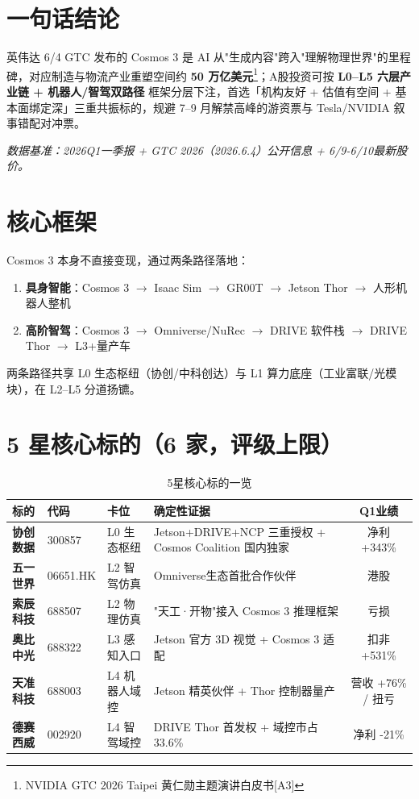 \section{一句话结论}

英伟达 6/4 GTC 发布的 Cosmos 3 是 AI 从"生成内容"跨入"理解物理世界"的里程碑，对应制造与物流产业重塑空间约 \textbf{50 万亿美元}\footnote{NVIDIA GTC 2026 Taipei 黄仁勋主题演讲白皮书[A3]}；A股投资可按 \textbf{L0--L5 六层产业链 + 机器人/智驾双路径} 框架分层下注，首选「机构友好 + 估值有空间 + 基本面绑定深」三重共振标的，规避 7--9 月解禁高峰的游资票与 Tesla/NVIDIA 叙事错配对冲票。

\textit{数据基准：2026Q1一季报 + GTC 2026（2026.6.4）公开信息 + 6/9-6/10最新股价。}

\section{核心框架}

Cosmos 3 本身不直接变现，通过两条路径落地：
\begin{enumerate}[leftmargin=2em]
  \item \textbf{具身智能}：Cosmos 3 $\rightarrow$ Isaac Sim $\rightarrow$ GR00T $\rightarrow$ Jetson Thor $\rightarrow$ 人形机器人整机
  \item \textbf{高阶智驾}：Cosmos 3 $\rightarrow$ Omniverse/NuRec $\rightarrow$ DRIVE 软件栈 $\rightarrow$ DRIVE Thor $\rightarrow$ L3+量产车
\end{enumerate}

两条路径共享 L0 生态枢纽（协创/中科创达）与 L1 算力底座（工业富联/光模块），在 L2--L5 分道扬镳。

\section{5 星核心标的（6 家，评级上限）}

\begin{table}[H]
\centering
\small
\renewcommand{\arraystretch}{1.3}
\begin{tabularx}{\textwidth}{l l l X c}
\toprule
\textbf{标的} & \textbf{代码} & \textbf{卡位} & \textbf{确定性证据} & \textbf{Q1业绩} \\
\midrule
\textbf{协创数据} & 300857 & L0 生态枢纽 & Jetson+DRIVE+NCP 三重授权 + Cosmos Coalition 国内独家 & 净利 +343\% \\
\textbf{五一世界} & 06651.HK & L2 智驾仿真 & Omniverse生态首批合作伙伴 & 港股 \\
\textbf{索辰科技} & 688507 & L2 物理仿真 & "天工·开物"接入 Cosmos 3 推理框架 & 亏损 \\
\textbf{奥比中光} & 688322 & L3 感知入口 & Jetson 官方 3D 视觉 + Cosmos 3 适配 & 扣非 +531\% \\
\textbf{天准科技} & 688003 & L4 机器人域控 & Jetson 精英伙伴 + Thor 控制器量产 & 营收 +76\% / 扭亏 \\
\textbf{德赛西威} & 002920 & L4 智驾域控 & DRIVE Thor 首发权 + 域控市占 33.6\% & 净利 -21\% \\
\bottomrule
\end{tabularx}
\caption{5星核心标的一览}
\end{table}

